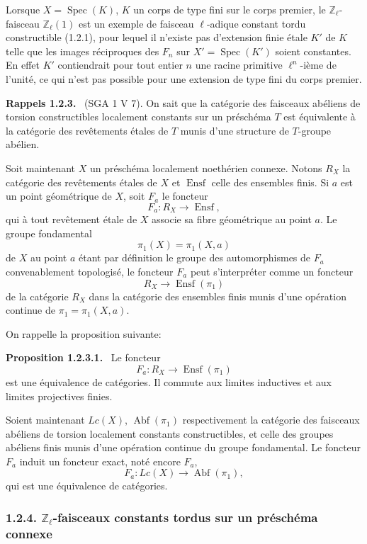 \documentclass[11pt]{article}
\newenvironment{statement}[1]{\par\medskip\noindent\textbf{#1.}\ }{\par\medskip}
\DeclareMathOperator{\Spec}{Spec}
\providecommand{\Ensf}{\operatorname{Ensf}}
\providecommand{\Abf}{\operatorname{Abf}}
\providecommand{\Spec}{\operatorname{Spec}}
\providecommand{\Spec}{\operatorname{Spec}}
\providecommand{\Spec}{\operatorname{Spec}}
\providecommand{\Spec}{\operatorname{Spec}}
\begin{document}
Lorsque \(X=\Spec(K)\), \(K\) un corps de type fini sur le corps premier, le \(\mathbb Z_\ell\)-faisceau \(\mathbb Z_\ell(1)\) est un exemple de faisceau \(\ell\)-adique constant tordu constructible (1.2.1), pour lequel il n'existe pas d'extension finie étale \(K'\) de \(K\) telle que les images réciproques des \(F_n\) sur \(X'=\Spec(K')\) soient constantes. En effet \(K'\) contiendrait pour tout entier \(n\) une racine primitive \(\ell^n\)-ième de l'unité, ce qui n'est pas possible pour une extension de type fini du corps premier.

\begin{statement}{Rappels 1.2.3}
(SGA 1 V 7). On sait que la catégorie des faisceaux abéliens de torsion constructibles localement constants sur un préschéma \(T\) est équivalente à la catégorie des revêtements étales de \(T\) munis d'une structure de \(T\)-groupe abélien.
\end{statement}

Soit maintenant \(X\) un préschéma localement noethérien connexe. Notons \(R_X\) la catégorie des revêtements étales de \(X\) et \(\Ensf\) celle des ensembles finis. Si \(a\) est un point géométrique de \(X\), soit \(F_a\) le foncteur
\[
F_a:R_X\longrightarrow \Ensf,
\]
qui à tout revêtement étale de \(X\) associe sa fibre géométrique au point \(a\). Le groupe fondamental
\[
\pi_1(X)=\pi_1(X,a)
\]
de \(X\) au point \(a\) étant par définition le groupe des automorphismes de \(F_a\) convenablement topologisé, le foncteur \(F_a\) peut s'interpréter comme un foncteur
\[
R_X\longrightarrow \Ensf(\pi_1)
\]
de la catégorie \(R_X\) dans la catégorie des ensembles finis munis d'une opération continue de \(\pi_1=\pi_1(X,a)\).

On rappelle la proposition suivante:

\begin{statement}{Proposition 1.2.3.1}
Le foncteur
\[
F_a:R_X\longrightarrow \Ensf(\pi_1)
\]
est une équivalence de catégories. Il commute aux limites inductives et aux limites projectives finies.
\end{statement}

Soient maintenant \(Lc(X)\), \(\Abf(\pi_1)\) respectivement la catégorie des faisceaux abéliens de torsion localement constants constructibles, et celle des groupes abéliens finis munis d'une opération continue du groupe fondamental. Le foncteur \(F_a\) induit un foncteur exact, noté encore \(F_a\),
\[
F_a:Lc(X)\longrightarrow \Abf(\pi_1),
\]
qui est une équivalence de catégories.

\subsubsection*{1.2.4. \(\mathbb Z_\ell\)-faisceaux constants tordus sur un préschéma connexe}
\end{document}
